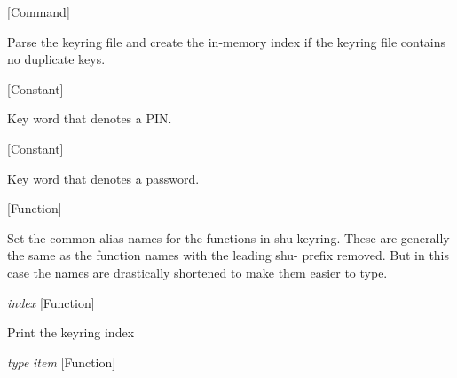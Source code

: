 \vspace{1em}
\noindent
{}
\usebox{\funcname}
 \hfill [Command]

\begin{doc-string}
Parse the keyring file and create the in-memory index if the keyring file
contains no duplicate keys.
\end{doc-string}

\vspace{1em}
\noindent
{}
\usebox{\funcname}
 \hfill [Constant]

\begin{doc-string}
Key word that denotes a PIN.
\end{doc-string}

\vspace{1em}
\noindent
{}
\usebox{\funcname}
 \hfill [Constant]

\begin{doc-string}
Key word that denotes a password.
\end{doc-string}

\vspace{1em}
\noindent
{}
\usebox{\funcname}
 \hfill [Function]

\begin{doc-string}
Set the common alias names for the functions in shu-keyring.
These are generally the same as the function names with the leading
shu- prefix removed.  But in this case the names are drastically shortened
to make them easier to type.
\end{doc-string}

\vspace{1em}
\noindent
{}
\usebox{\funcname}\emph{index}
 \hfill [Function]

\begin{doc-string}
Print the keyring index
\end{doc-string}

\vspace{1em}
\noindent
{}
\usebox{\funcname}\emph{type} \emph{item}
 \hfill [Function]

